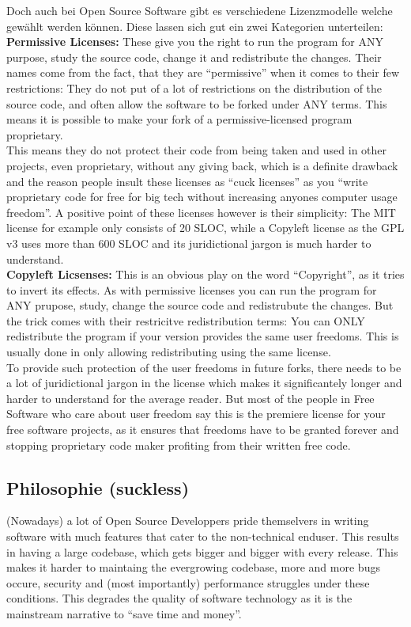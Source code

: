 \documentclass[a4paper,11pt]{article}
\begin{document}
Doch auch bei Open Source Software gibt es verschiedene Lizenzmodelle welche gewählt werden können. Diese lassen sich gut ein zwei Kategorien unterteilen:\\

\textbf{Permissive Licenses:}
These give you the right to run the program for ANY purpose, study the source code, change it and redistribute the changes. Their names come from the fact, that they are ``permissive'' when it comes to their few restrictions: They do not put of a lot of restrictions on the distribution of the source code, and often allow the software to be forked under ANY terms. This means it is possible to make your fork of a permissive-licensed program proprietary.\\

This means they do not protect their code from being taken and used in other projects, even proprietary, without any giving back, which is a definite drawback and the reason people insult these licenses as ``cuck licenses'' as you ``write proprietary code for free for big tech without increasing anyones computer usage freedom''. A positive point of these licenses however is their simplicity: The MIT license for example only consists of 20 SLOC, while a Copyleft license as the GPL v3 uses more than 600 SLOC and its juridictional jargon is much harder to understand.\\

\textbf{Copyleft Licsenses:}
This is an obvious play on the word ``Copyright'', as it tries to invert its effects. As with permissive licenses you can run the program for ANY prupose, study, change the source code and redistrubute the changes. But the trick comes with their restricitve redistribution terms: You can ONLY redistribute the program if your version provides the same user freedoms. This is usually done in only allowing redistributing using the same license.\\

To provide such protection of the user freedoms in future forks, there needs to be a lot of juridictional jargon in the license which makes it significantely longer and harder to understand for the average reader. But most of the people in Free Software who care about user freedom say this is the premiere license for your free software projects, as it ensures that freedoms have to be granted forever and stopping proprietary code maker profiting from their written free code.\\

\subsection{Philosophie (suckless)}
(Nowadays) a lot of Open Source Developpers pride themselvers in writing software with much features that cater to the non-technical enduser. This results in having a large codebase, which gets bigger and bigger with every release. This makes it harder to maintaing the evergrowing codebase, more and more bugs occure, security and (most importantly) performance struggles under these conditions. This degrades the quality of software technology as it is the mainstream narrative to ``save time and money''.\\
\end{document}
